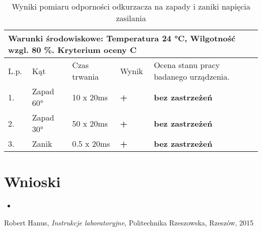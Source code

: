 \documentclass{classrep}
\begin{document}
\begin{table}[H]
	\centering
	\caption{Wyniki pomiaru odporności odkurzacza na zapady i zaniki napięcia zasilania}
	\label{tab:3}
	\begin{tabular}{|l|l|l|l|l|}
		\hline
		\multicolumn{5}{|l|}{\textbf{Warunki środowiskowe: Temperatura 24 °C, Wilgotność wzgl. 80 \%.  Kryterium oceny C}} \\ \hline
		L.p.       & Kąt              & Czas trwania       & Wynik            & Ocena stanu pracy badanego urządzenia.      \\ \hline
		1.         & Zapad  60°       & 10 x 20ms          & \textbf{+}       & \textbf{bez zastrzeżeń}                     \\ \hline
		2.         & Zapad  30°       & 50 x 20ms          & \textbf{+}       & \textbf{bez zastrzeżeń}                     \\ \hline
		3.         & Zanik            & 0.5 x 20ms         & \textbf{+}       & \textbf{bez zastrzeżeń}                     \\ \hline
	\end{tabular}
\end{table}

\section{Wnioski}
\begin{itemize}
	\item 
\end{itemize}

\begin{thebibliography}{0}
   Robert Hanus,
    \textsl{Instrukcje laboratoryjne,} Politechnika Rzeszowska, Rzeszów, 2015
\end{thebibliography}
\end{document}
